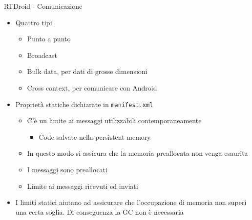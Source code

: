 \begin{frame}{RTDroid - Comunicazione}
	\begin{itemize}
		\item Quattro tipi
		\begin{itemize}
			\item Punto a punto
			\item Broadcast
			\item Bulk data, per dati di grosse dimensioni
			\item Cross context, per comunicare con Android
		\end{itemize}
		\item Proprietà statiche dichiarate in \texttt{manifest.xml}
		\begin{itemize}
			\item C'è un limite ai messaggi utilizzabili contemporaneamente
			\begin{itemize}
				\item Code salvate nella persistent memory
			\end{itemize}
			\item In questo modo si assicura che la memoria preallocata non venga esaurita
			\item I messaggi sono preallocati
			\item Limite ai messaggi ricevuti ed inviati
		\end{itemize}
		\item I limiti statici aiutano ad assicurare che l'occupazione di memoria non superi una certa soglia. Di conseguenza la GC non è necessaria
	\end{itemize}
\end{frame}